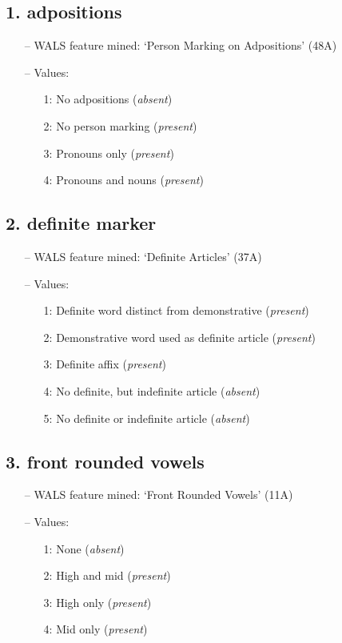 \subsection*{1. adpositions}

\begin{itemize}
\item[--] WALS feature mined: `Person Marking on Adpositions' (48A)
\item[--] Values:

\begin{enumerate}
\item[1:] No adpositions (\emph{absent})
\item[2:] No person marking (\emph{present})
\item[3:] Pronouns only (\emph{present})
\item[4:] Pronouns and nouns (\emph{present})
\end{enumerate}
\end{itemize}

\subsection*{2. definite marker}

\begin{itemize}
\item[--] WALS feature mined: `Definite Articles' (37A)
\item[--] Values:

\begin{enumerate}
\item[1:] Definite word distinct from demonstrative (\emph{present})
\item[2:] Demonstrative word used as definite article (\emph{present})
\item[3:] Definite affix (\emph{present})
\item[4:] No definite, but indefinite article (\emph{absent})
\item[5:] No definite or indefinite article (\emph{absent})
\end{enumerate}
\end{itemize}

\subsection*{3. front rounded vowels}

\begin{itemize}
\item[--] WALS feature mined: `Front Rounded Vowels' (11A)
\item[--] Values:

\begin{enumerate}
\item[1:] None (\emph{absent})
\item[2:] High and mid (\emph{present})
\item[3:] High only (\emph{present})
\item[4:] Mid only (\emph{present})
\end{enumerate}
\end{itemize}

